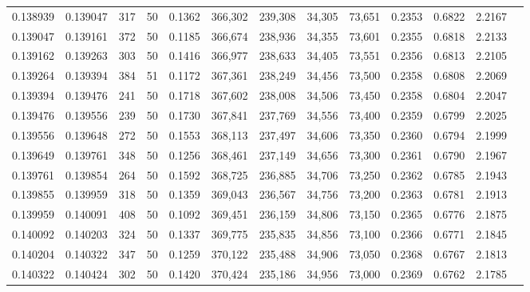 \begin{tabular}{rrrrrrrrrrrrr}
0.138939 & 0.139047 &   317 &  50 &                                     0.1362 & 366,302 & 239,308 &  34,305 &  73,651 & 0.2353 & 0.6822 & 2.2167 \\
0.139047 & 0.139161 &   372 &  50 &                                     0.1185 & 366,674 & 238,936 &  34,355 &  73,601 & 0.2355 & 0.6818 & 2.2133 \\
0.139162 & 0.139263 &   303 &  50 &                                     0.1416 & 366,977 & 238,633 &  34,405 &  73,551 & 0.2356 & 0.6813 & 2.2105 \\
0.139264 & 0.139394 &   384 &  51 &                                     0.1172 & 367,361 & 238,249 &  34,456 &  73,500 & 0.2358 & 0.6808 & 2.2069 \\
0.139394 & 0.139476 &   241 &  50 &                                     0.1718 & 367,602 & 238,008 &  34,506 &  73,450 & 0.2358 & 0.6804 & 2.2047 \\
0.139476 & 0.139556 &   239 &  50 &                                     0.1730 & 367,841 & 237,769 &  34,556 &  73,400 & 0.2359 & 0.6799 & 2.2025 \\
0.139556 & 0.139648 &   272 &  50 &                                     0.1553 & 368,113 & 237,497 &  34,606 &  73,350 & 0.2360 & 0.6794 & 2.1999 \\
0.139649 & 0.139761 &   348 &  50 &                                     0.1256 & 368,461 & 237,149 &  34,656 &  73,300 & 0.2361 & 0.6790 & 2.1967 \\
0.139761 & 0.139854 &   264 &  50 &                                     0.1592 & 368,725 & 236,885 &  34,706 &  73,250 & 0.2362 & 0.6785 & 2.1943 \\
0.139855 & 0.139959 &   318 &  50 &                                     0.1359 & 369,043 & 236,567 &  34,756 &  73,200 & 0.2363 & 0.6781 & 2.1913 \\
0.139959 & 0.140091 &   408 &  50 &                                     0.1092 & 369,451 & 236,159 &  34,806 &  73,150 & 0.2365 & 0.6776 & 2.1875 \\
0.140092 & 0.140203 &   324 &  50 &                                     0.1337 & 369,775 & 235,835 &  34,856 &  73,100 & 0.2366 & 0.6771 & 2.1845 \\
0.140204 & 0.140322 &   347 &  50 &                                     0.1259 & 370,122 & 235,488 &  34,906 &  73,050 & 0.2368 & 0.6767 & 2.1813 \\
0.140322 & 0.140424 &   302 &  50 &                                     0.1420 & 370,424 & 235,186 &  34,956 &  73,000 & 0.2369 & 0.6762 & 2.1785 \\

\end{tabular}
